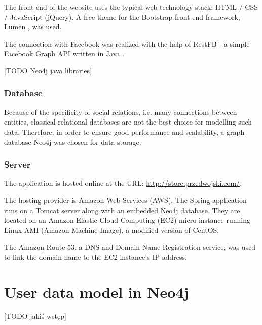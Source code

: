 \documentclass[12pt]{report}
\begin{document}
The front-end of the website uses the typical web technology stack: HTML / CSS / JavaScript (jQuery). A free theme for the Bootstrap front-end framework, Lumen \cite{lumen}, was used.

The connection with Facebook was realized with the help of RestFB - a simple Facebook Graph API written in Java \cite{restfb}.

\hbox{}
[TODO Neo4j java libraries]

\subsubsection{Database}

Because of the specificity of social relations, i.e. many connections between entities, classical relational databases are not the best choice for modelling such data. Therefore, in order to ensure good performance and scalability, a graph database Neo4j \cite{neo4j} was chosen for data storage.

\subsubsection{Server}

The application is hosted online at the URL: \url{http://store.przedwojski.com/}. 

The hosting provider is Amazon Web Services (AWS). The Spring application runs on a Tomcat server along with an embedded Neo4j database. They are located on an Amazon Elastic Cloud Computing (EC2) micro instance running Linux AMI (Amazon Machine Image), a modified version of CentOS.

The Amazon Route 53, a DNS and Domain Name Registration service, was used to link the domain name to the EC2 instance's IP address.








\section{User data model in Neo4j}

[TODO jakiś wstęp]
\end{document}
